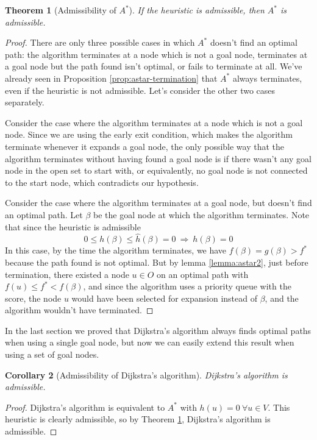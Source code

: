 \documentclass[12pt]{report}
\newtheorem{theorem}{Theorem}[chapter]
\newtheorem{corollary}[theorem]{Corollary}
\begin{document}
\begin{theorem}[Admissibility of $A^*$]
\label{thm:astar}
If the heuristic is admissible, then $A^*$ is admissible.
\end{theorem}
\begin{proof}
There are only three possible cases in which $A^*$ doesn't find an optimal path: the algorithm terminates at a node which is not a goal node, terminates at a goal node but the path found isn't optimal, or fails to terminate at all. We've already seen in Proposition \ref{prop:astar-termination} that $A^*$ always terminates, even if the heuristic is not admissible. Let's consider the other two cases separately.

Consider the case where the algorithm terminates at a node which is not a goal node. Since we are using the early exit condition, which makes the algorithm terminate whenever it expands a goal node, the only possible way that the algorithm terminates without having found a goal node is if there wasn't any goal node in the open set to start with, or equivalently, no goal node is not connected to the start node, which contradicts our hypothesis.

Consider the case where the algorithm terminates at a goal node, but doesn't find an optimal path. Let $\beta$ be the goal node at which the algorithm terminates. Note that since the heuristic is admissible
\[ 0 \leq h(\beta) \leq \hat{h}(\beta) = 0 \  \Rightarrow \  h(\beta) = 0 \]
In this case, by the time the algorithm terminates, we have $f(\beta) = g(\beta) > f^*$ because the path found is not optimal. But by lemma \ref{lemma:astar2}, just before termination, there existed a node $u \in O$ on an optimal path with $f(u) \leq f^* < f(\beta)$, and since the algorithm uses a priority queue with the score, the node $u$ would have been selected for expansion instead of $\beta$, and the algorithm wouldn't have terminated.
\end{proof}

In the last section we proved that Dijkstra's algorithm always finds optimal paths when using a single goal node, but now we can easily extend this result when using a set of goal nodes.

\begin{corollary}[Admissibility of Dijkstra's algorithm]
Dijkstra's algorithm is admissible.
\end{corollary}
\begin{proof}
Dijkstra's algorithm is equivalent to $A^*$ with $h(u) = 0 \  \forall u \in V$. This heuristic is clearly admissible, so by Theorem \ref{thm:astar}, Dijkstra's algorithm is admissible.
\end{proof}
\end{document}
